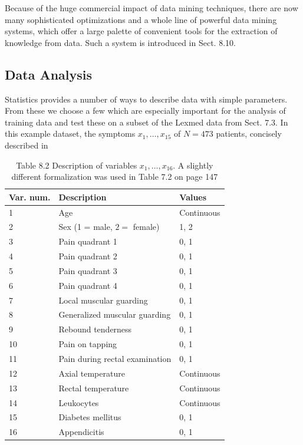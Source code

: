 \documentclass[10pt]{article}
\begin{document}
Because of the huge commercial impact of data mining techniques, there are now many sophisticated optimizations and a whole line of powerful data mining systems, which offer a large palette of convenient tools for the extraction of knowledge from data. Such a system is introduced in Sect. 8.10.

\subsection*{Data Analysis}
Statistics provides a number of ways to describe data with simple parameters. From these we choose a few which are especially important for the analysis of training data and test these on a subset of the Lexmed data from Sect. 7.3. In this example dataset, the symptoms $x_{1}, \ldots, x_{15}$ of $N=473$ patients, concisely described in

\begin{table}[h]
\begin{center}
\captionsetup{labelformat=empty}
\caption{Table 8.2 Description of variables $x_{1}, \ldots, x_{16}$. A slightly different formalization was used in Table 7.2 on page 147}
\begin{tabular}{|l|l|l|}
\hline
Var. num. & Description & Values \\
\hline
1 & Age & Continuous \\
\hline
2 & Sex (1 = male, $2=$ female) & 1, 2 \\
\hline
3 & Pain quadrant 1 & 0, 1 \\
\hline
4 & Pain quadrant 2 & 0, 1 \\
\hline
5 & Pain quadrant 3 & 0, 1 \\
\hline
6 & Pain quadrant 4 & 0, 1 \\
\hline
7 & Local muscular guarding & 0, 1 \\
\hline
8 & Generalized muscular guarding & 0, 1 \\
\hline
9 & Rebound tenderness & 0, 1 \\
\hline
10 & Pain on tapping & 0, 1 \\
\hline
11 & Pain during rectal examination & 0, 1 \\
\hline
12 & Axial temperature & Continuous \\
\hline
13 & Rectal temperature & Continuous \\
\hline
14 & Leukocytes & Continuous \\
\hline
15 & Diabetes mellitus & 0, 1 \\
\hline
16 & Appendicitis & 0, 1 \\
\hline
\end{tabular}
\end{center}
\end{table}
\end{document}
